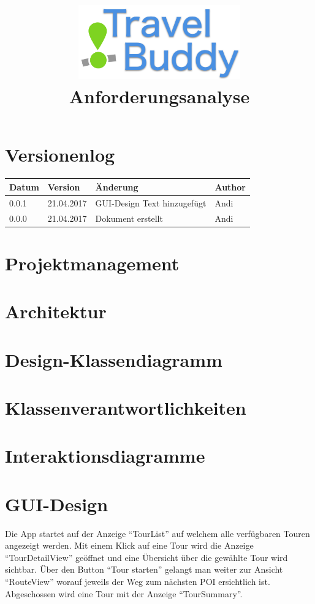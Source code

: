 \documentclass[a4paper,10pt,xetex]{article}
\title{
  \includegraphics[width=7cm]{travel-buddy_white}\\[\bigskipamount]
  Anforderungsanalyse\\[\bigskipamount]
}
\author{\documentauthors}
\date{\parbox{\linewidth}{\centering%
  IT15TA ZH \hspace*{3cm} Gruppe 3\endgraf\bigskip
  \documentdate\endgraf
}}
\begin{document}
\maketitle\newpage

{
\hypersetup{linkcolor=black}
\setcounter{tocdepth}{3}
\tableofcontents
}

\newpage

\section{Versionenlog}\label{versionenlog}

\tabulinesep=1.2mm

\begin{longtabu} to \textwidth { | l | l | X[l] | l | }
  \hline
  \textbf{Datum} & \textbf{Version} & \textbf{Änderung} & \textbf{Author} \\
  \hline
  \endhead

  0.0.1 & 21.04.2017 & GUI-Design Text hinzugefügt & Andi\\
  \hline

  0.0.0 & 21.04.2017 & Dokument erstellt & Andi\\
  \hline
\end{longtabu}
\newpage

\section{Projektmanagement}\label{projektmanagement}
\section{Architektur}\label{architektur}
\section{Design-Klassendiagramm}\label{design-klassendiagram}
\section{Klassenverantwortlichkeiten}\label{klassenverantwortlichkeiten}
\section{Interaktionsdiagramme}\label{interaktionsdiagramme}

\section{GUI-Design}\label{gui-design}
Die App startet auf der Anzeige ``TourList'' auf welchem alle verfügbaren Touren angezeigt
werden. Mit einem Klick auf eine Tour wird die Anzeige ``TourDetailView'' geöffnet und eine
Übersicht über die gewählte Tour wird sichtbar. Über den Button ``Tour starten'' gelangt
man weiter zur Ansicht ``RouteView'' worauf jeweils der Weg zum nächsten POI ersichtlich ist.
Abgeschossen wird eine Tour mit der Anzeige ``TourSummary''.
\end{document}
